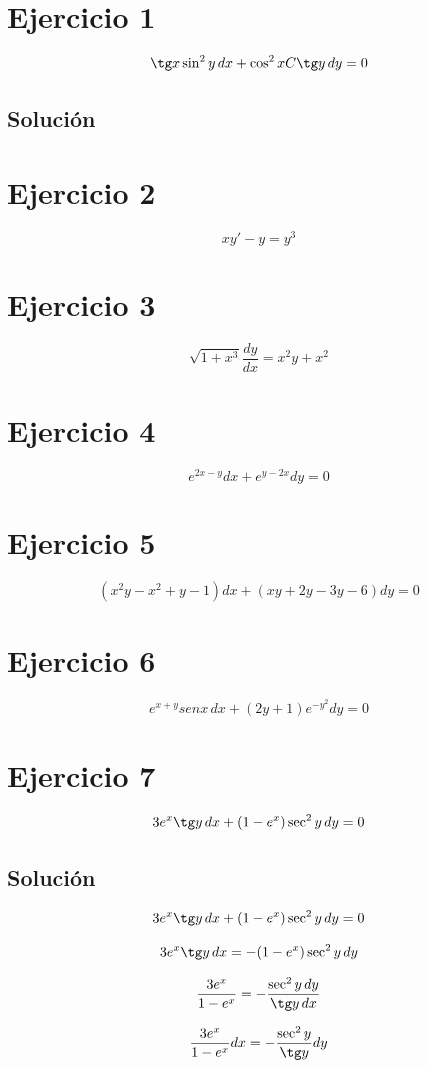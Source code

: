 \documentclass[12pt,a4paper]{article}
\begin{document}
\begin{multicols}{2}
  

\section*{Ejercicio 1}
\[\tg x \sin^2 y \, dx + \cos^2 xC \tg y \, dy = 0\]
\subsection*{Solución}

\section*{Ejercicio 2}
\[xy\prime -y=y^3\]

\section*{Ejercicio 3}
\[\sqrt{1+x^3}\frac{dy}{dx}=x^2y+x^2 \]

\section*{Ejercicio 4}
\[e^{2x-y}dx+e^{y-2x}dy=0\]

\section*{Ejercicio 5}
\[(x^2y-x^2+y-1)dx+(xy+2y-3y-6)dy=0\]

\section*{Ejercicio 6}
\[e^{x+y}senx \, dx+(2y+1)e^{-y^2}dy=0\]


\section*{Ejercicio 7} \[3e^x\tg y \, dx+(1-e^x)\sec^2 y \, dy=0\] 
\subsection*{Solución} 
\[3e^x\tg y \, dx+(1-e^x)\sec^2 y \, dy=0\] 

\[3e^x\tg y\,dx=-(1-e^x)\sec^2 y\,dy\] 

\[\frac{3e^x}{1-e^x}=-\frac{\sec^2 y\,dy}{\tg y\,dx}\] 

\[\frac{3e^x}{1-e^x}dx=-\frac{\sec^2 y}{\tg y}dy\] 


\end{multicols}
\end{document}
